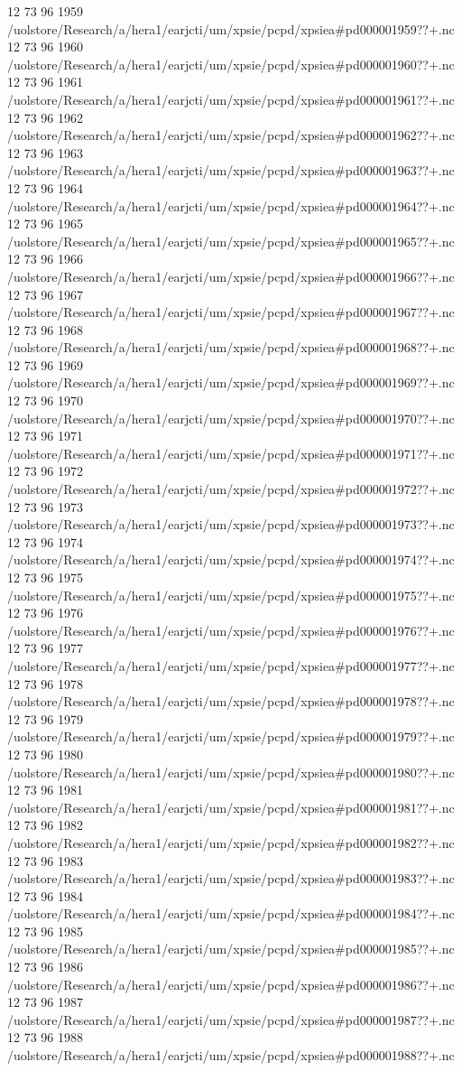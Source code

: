 12 73 96
1959
/uolstore/Research/a/hera1/earjcti/um/xpsie/pcpd/xpsiea#pd000001959??+.nc
12 73 96
1960
/uolstore/Research/a/hera1/earjcti/um/xpsie/pcpd/xpsiea#pd000001960??+.nc
12 73 96
1961
/uolstore/Research/a/hera1/earjcti/um/xpsie/pcpd/xpsiea#pd000001961??+.nc
12 73 96
1962
/uolstore/Research/a/hera1/earjcti/um/xpsie/pcpd/xpsiea#pd000001962??+.nc
12 73 96
1963
/uolstore/Research/a/hera1/earjcti/um/xpsie/pcpd/xpsiea#pd000001963??+.nc
12 73 96
1964
/uolstore/Research/a/hera1/earjcti/um/xpsie/pcpd/xpsiea#pd000001964??+.nc
12 73 96
1965
/uolstore/Research/a/hera1/earjcti/um/xpsie/pcpd/xpsiea#pd000001965??+.nc
12 73 96
1966
/uolstore/Research/a/hera1/earjcti/um/xpsie/pcpd/xpsiea#pd000001966??+.nc
12 73 96
1967
/uolstore/Research/a/hera1/earjcti/um/xpsie/pcpd/xpsiea#pd000001967??+.nc
12 73 96
1968
/uolstore/Research/a/hera1/earjcti/um/xpsie/pcpd/xpsiea#pd000001968??+.nc
12 73 96
1969
/uolstore/Research/a/hera1/earjcti/um/xpsie/pcpd/xpsiea#pd000001969??+.nc
12 73 96
1970
/uolstore/Research/a/hera1/earjcti/um/xpsie/pcpd/xpsiea#pd000001970??+.nc
12 73 96
1971
/uolstore/Research/a/hera1/earjcti/um/xpsie/pcpd/xpsiea#pd000001971??+.nc
12 73 96
1972
/uolstore/Research/a/hera1/earjcti/um/xpsie/pcpd/xpsiea#pd000001972??+.nc
12 73 96
1973
/uolstore/Research/a/hera1/earjcti/um/xpsie/pcpd/xpsiea#pd000001973??+.nc
12 73 96
1974
/uolstore/Research/a/hera1/earjcti/um/xpsie/pcpd/xpsiea#pd000001974??+.nc
12 73 96
1975
/uolstore/Research/a/hera1/earjcti/um/xpsie/pcpd/xpsiea#pd000001975??+.nc
12 73 96
1976
/uolstore/Research/a/hera1/earjcti/um/xpsie/pcpd/xpsiea#pd000001976??+.nc
12 73 96
1977
/uolstore/Research/a/hera1/earjcti/um/xpsie/pcpd/xpsiea#pd000001977??+.nc
12 73 96
1978
/uolstore/Research/a/hera1/earjcti/um/xpsie/pcpd/xpsiea#pd000001978??+.nc
12 73 96
1979
/uolstore/Research/a/hera1/earjcti/um/xpsie/pcpd/xpsiea#pd000001979??+.nc
12 73 96
1980
/uolstore/Research/a/hera1/earjcti/um/xpsie/pcpd/xpsiea#pd000001980??+.nc
12 73 96
1981
/uolstore/Research/a/hera1/earjcti/um/xpsie/pcpd/xpsiea#pd000001981??+.nc
12 73 96
1982
/uolstore/Research/a/hera1/earjcti/um/xpsie/pcpd/xpsiea#pd000001982??+.nc
12 73 96
1983
/uolstore/Research/a/hera1/earjcti/um/xpsie/pcpd/xpsiea#pd000001983??+.nc
12 73 96
1984
/uolstore/Research/a/hera1/earjcti/um/xpsie/pcpd/xpsiea#pd000001984??+.nc
12 73 96
1985
/uolstore/Research/a/hera1/earjcti/um/xpsie/pcpd/xpsiea#pd000001985??+.nc
12 73 96
1986
/uolstore/Research/a/hera1/earjcti/um/xpsie/pcpd/xpsiea#pd000001986??+.nc
12 73 96
1987
/uolstore/Research/a/hera1/earjcti/um/xpsie/pcpd/xpsiea#pd000001987??+.nc
12 73 96
1988
/uolstore/Research/a/hera1/earjcti/um/xpsie/pcpd/xpsiea#pd000001988??+.nc
